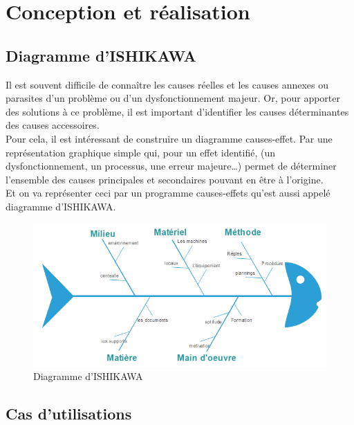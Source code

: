 \documentclass[a4paper]{report}
\begin{document}
\chapter{Conception et réalisation}
\section{Diagramme d'ISHIKAWA}
Il est souvent difficile de connaître les causes réelles et les causes annexes ou parasites d’un problème ou d’un dysfonctionnement majeur. Or, pour apporter des solutions à ce problème, il est important d’identifier les causes déterminantes des causes accessoires.\\
Pour cela, il est intéressant de construire un diagramme causes-effet. Par une représentation graphique simple qui, pour un effet identifié, (un dysfonctionnement, un processus, une erreur
majeure…) permet de déterminer l’ensemble des causes principales et secondaires pouvant en être à l’origine.\\
Et on va représenter ceci par un programme causes-effets qu'est  aussi appelé diagramme d’ISHIKAWA.\\
\begin{figure}[!h]
    \centering
    \includegraphics[width=15cm]{images/Ishikawa.PNG}
    \caption{Diagramme d'ISHIKAWA}
    \label{fig:Diagramme d'ISHIKAWA}
\end{figure}
\newpage
\section{Cas d'utilisations}
\end{document}

